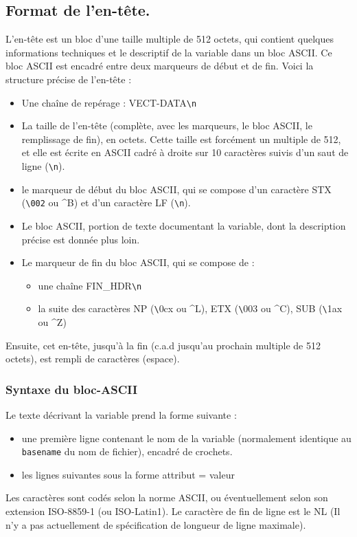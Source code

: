 \subsection{Format de l'en-tête.}
L'en-tête est un bloc d'une taille multiple de 512
octets, qui contient quelques informations techniques et le descriptif de la
variable dans un bloc ASCII. Ce bloc ASCII est encadré entre deux
marqueurs de début et de fin.
Voici la structure précise de l'en-tête :
\begin{itemize}
  \item Une chaîne de repérage : \og VECT-DATA\texttt{\textbackslash{}n}\fg{}
  \item La taille de l'en-tête (complète, avec les marqueurs, le bloc
ASCII, le remplissage de fin), en octets. Cette taille est forcément un
multiple de 512, et elle est écrite en ASCII cadré à
droite sur 10 caractères suivis d'un saut de ligne 
(\og \texttt{\textbackslash{}n}\fg{}).
  \item le marqueur de début du bloc ASCII, qui se compose 
    d'un caractère \og STX\fg{} (\texttt{\textbackslash{}002} ou \^{}B)
    et d'un caractère \og LF\fg{} (\texttt{\textbackslash{}n}).
  \item Le bloc ASCII, portion de texte documentant la variable, dont la
description précise est donnée plus loin.
  \item Le marqueur de fin du bloc ASCII, qui se compose de :
  \begin{itemize}
    \item une chaîne \og FIN\_HDR\texttt{\textbackslash{}{}n}\fg{}
    \item la suite des caractères \og NP\fg{} (\texttt{\textbackslash{}}0cx ou \^{}L),
       \og ETX\fg{} (\texttt{\textbackslash{}}003 ou \^{}C),
      \og SUB\fg{} (\texttt{\textbackslash{}}1ax ou \^{}Z)
  \end{itemize}
\end{itemize}
Ensuite, cet en-tête, jusqu'à la fin (c.a.d jusqu'au prochain
multiple de 512 octets), est rempli de caractères \og \fg{} (espace).


\subsubsection{Syntaxe du \og bloc-ASCII\fg{}}
Le texte décrivant la variable prend la forme suivante :
\begin{itemize}
  \item une première ligne contenant le nom de la variable (normalement
identique au \texttt{basename} du nom de fichier), encadré de crochets.
  \item les lignes suivantes sous la forme \og \textsf{attribut = valeur}\fg{}
\end{itemize}
Les caractères sont codés selon la norme ASCII, ou
éventuellement selon son extension ISO-8859-1 (ou ISO-Latin1).
Le caractère de fin de ligne est le \og NL\fg{}
(Il n'y a pas actuellement de spécification de longueur de ligne maximale).

